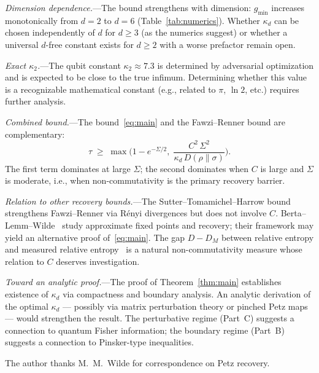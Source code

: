 \documentclass[prl,twocolumn,superscriptaddress,longbibliography,floatfix]{revtex4-2}
\newcommand{\tauasym}{\tau}
\newcommand{\kd}{\kappa_d}
\begin{document}
\emph{Dimension dependence.}---The bound strengthens with
dimension: $g_{\min}$ increases monotonically from
$d = 2$ to $d = 6$ (Table~\ref{tab:numerics}).
Whether $\kd$ can be chosen independently of $d$ for
$d \geq 3$ (as the numerics suggest) or whether
a universal $d$-free constant exists for $d \geq 2$
with a worse prefactor remain open.

\emph{Exact $\kappa_2$.}---The qubit constant
$\kappa_2 \approx 7.3$ is determined by adversarial
optimization and is expected to be close to the true
infimum.
Determining whether this value is a recognizable
mathematical constant (e.g., related to $\pi$, $\ln 2$,
etc.) requires further analysis.

\emph{Combined bound.}---The bound~\eqref{eq:main} and
the Fawzi--Renner bound are complementary:
\begin{equation}
\tauasym \;\geq\; \max\!\bigg(
  1 - e^{-\Sigma/2},\;
  \frac{C^2\, \Sigma^2}{\kd\, D(\rho\|\sigma)}
\bigg).
\label{eq:combined}
\end{equation}
The first term dominates at large $\Sigma$; the second
dominates when $C$ is large and $\Sigma$ is moderate,
i.e., when non-commutativity is the primary recovery
barrier.

\emph{Relation to other recovery bounds.}---The
Sutter--Tomamichel--Harrow bound~\cite{Sutter2016}
strengthens Fawzi--Renner via R\'enyi divergences but
does not involve $C$.
Berta--Lemm--Wilde~\cite{Berta2024} study approximate
fixed points and recovery; their framework may yield an
alternative proof of~\eqref{eq:main}.
The gap $D - D_M$ between relative entropy and measured
relative entropy~\cite{Hiai2011,Donald1986} is a natural
non-commutativity measure whose relation to $C$ deserves
investigation.

\emph{Toward an analytic proof.}---The proof of
Theorem~\ref{thm:main} establishes existence of $\kd$
via compactness and boundary analysis.
An analytic derivation of the optimal $\kd$ --- possibly
via matrix perturbation theory or pinched Petz
maps~\cite{Sutter2016} --- would strengthen the result.
The perturbative regime (Part~C) suggests a connection
to quantum Fisher information; the boundary regime
(Part~B) suggests a connection to Pinsker-type
inequalities.

\begin{acknowledgments}
The author thanks M.~M.~Wilde for correspondence on
Petz recovery.
\end{acknowledgments}

\end{document}
